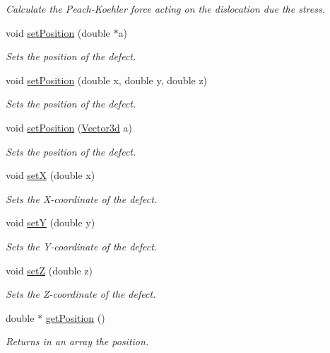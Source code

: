 \begin{DoxyCompactItemize}
\begin{DoxyCompactList}\small\item\em Calculate the Peach-\/\-Koehler force acting on the dislocation due the stress. \end{DoxyCompactList}\item 
void \hyperlink{classDefect_a2d233d13a8a93f6fba463a1fbc1c6c9f}{set\-Position} (double $\ast$a)
\begin{DoxyCompactList}\small\item\em Sets the position of the defect. \end{DoxyCompactList}\item 
void \hyperlink{classDefect_ad1a6acd8399d2ecabb7ce2b77623bbec}{set\-Position} (double x, double y, double z)
\begin{DoxyCompactList}\small\item\em Sets the position of the defect. \end{DoxyCompactList}\item 
void \hyperlink{classDefect_a36ffa9b4b01d38ed8a95ca2c78973cc4}{set\-Position} (\hyperlink{classVector3d}{Vector3d} a)
\begin{DoxyCompactList}\small\item\em Sets the position of the defect. \end{DoxyCompactList}\item 
void \hyperlink{classDefect_a5a65f73da6a572d9e7109b31239e441d}{set\-X} (double x)
\begin{DoxyCompactList}\small\item\em Sets the X-\/coordinate of the defect. \end{DoxyCompactList}\item 
void \hyperlink{classDefect_a268606391a4eaee3de029d2005648b6f}{set\-Y} (double y)
\begin{DoxyCompactList}\small\item\em Sets the Y-\/coordinate of the defect. \end{DoxyCompactList}\item 
void \hyperlink{classDefect_abb0b16c44a1b04d782f5c5f598b49d5b}{set\-Z} (double z)
\begin{DoxyCompactList}\small\item\em Sets the Z-\/coordinate of the defect. \end{DoxyCompactList}\item 
double $\ast$ \hyperlink{classDefect_a270caed3561fa5fa284af6427b6ca2e4}{get\-Position} ()
\begin{DoxyCompactList}\small\item\em Returns in an array the position. \end{DoxyCompactList}\item 

\end{DoxyCompactItemize}
